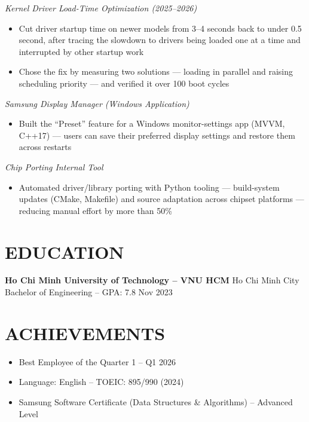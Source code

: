 \documentclass[a4paper,10pt]{article}
\newcommand{\project}[1]{\vspace{2pt}\textit{#1}\vspace{1pt}}
\begin{document}
\project{Kernel Driver Load-Time Optimization (2025--2026)}
\begin{itemize}
    \item Cut driver startup time on newer models from 3--4 seconds back to under
          0.5 second, after tracing the slowdown to drivers being loaded one at a time
          and interrupted by other startup work
    \item Chose the fix by measuring two solutions --- loading in parallel and
          raising scheduling priority --- and verified it over 100 boot cycles
\end{itemize}

\project{Samsung Display Manager (Windows Application)}
\begin{itemize}
    \item Built the ``Preset'' feature for a Windows monitor-settings app (MVVM, C++17) ---
          users can save their preferred display settings and restore them across restarts
\end{itemize}

\project{Chip Porting Internal Tool}
\begin{itemize}
    \item Automated driver/library porting with Python tooling --- build-system updates
          (CMake, Makefile) and source adaptation across chipset platforms ---
          reducing manual effort by more than 50\%
\end{itemize}

\section*{EDUCATION}
\textbf{Ho Chi Minh University of Technology -- VNU HCM} \hfill Ho Chi Minh City \\
Bachelor of Engineering -- GPA: 7.8 \hfill Nov 2023

\section*{ACHIEVEMENTS}
\begin{itemize}
    \item Best Employee of the Quarter 1 -- Q1 2026
    \item Language: English -- TOEIC: 895/990 (2024)
    \item Samsung Software Certificate (Data Structures \& Algorithms) -- Advanced Level
\end{itemize}
\end{document}
